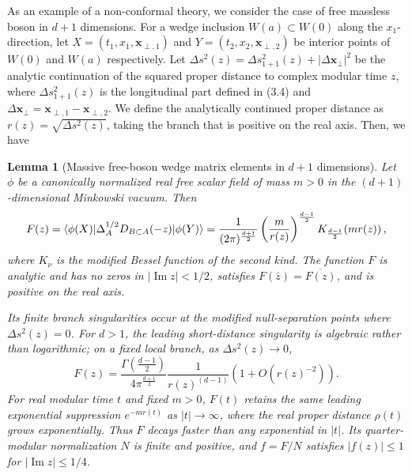 \documentclass[a4paper,11pt]{article}
\newtheorem{lemma}[theorem]{Lemma}
\theoremstyle{definition}
\newcommand{\lb}{\left(}
\newcommand{\rb}{\right)}
\begin{document}
As an example of a non-conformal theory, we consider the case of free massless boson in $d+1$ dimensions. For a wedge inclusion $W(a) \subset W(0)$ along the $x_1$-direction, let $X = (t_1, x_1, \mathbf{x}_{\perp, 1})$ and $Y = (t_2, x_2, \mathbf{x}_{\perp, 2})$ be interior points of $W(0)$ and $W(a)$ respectively. Let $\Delta s^2(z) = \Delta s_{1+1}^2(z) + |\Delta \mathbf{x}_\perp|^2$ be the analytic continuation of the squared proper distance to complex modular time $z$, where $\Delta s_{1+1}^2(z)$ is the longitudinal part defined in (3.4) and $\Delta \mathbf{x}_\perp = \mathbf{x}_{\perp, 1} - \mathbf{x}_{\perp, 2}$. We define the analytically continued proper distance as $r(z) = \sqrt{\Delta s^2(z)}$, taking the branch that is positive on the real axis. Then, we have
\begin{lemma}[Massive free-boson wedge matrix elements in $d+1$ dimensions] 
\label{lem:massive-free-boson-wedge-d-dim}
Let $\phi$ be a canonically normalized real free scalar field of mass $m > 0$ in the $(d+1)$-dimensional Minkowski vacuum. Then
\begin{equation}
    F(z) = \braket{\phi(X) | \Delta_A^{1/2} D_{B \subset A}(-z) | \phi(Y)} = \frac{1}{(2\pi)^{\frac{d+1}{2}}} \left( \frac{m}{r(z)} \right)^{\frac{d-1}{2}} K_{\frac{d-1}{2}}\!\left( m r(z) \right),
\end{equation}
where $K_{\nu}$ is the modified Bessel function of the second kind. The function $F$ is analytic and has no zeros in $|\operatorname{Im} z| < 1/2$, satisfies $F(\bar{z}) = \overline{F(z)}$, and is positive on the real axis. 

Its finite branch singularities occur at the modified null-separation points where $\Delta s^2(z) = 0$. For $d > 1$, the leading short-distance singularity is algebraic rather than logarithmic; on a fixed local branch, as $\Delta s^2(z) \to 0$,
\begin{equation}
    F(z) = \frac{\Gamma\left(\frac{d-1}{2}\right)}{4 \pi^{\frac{d+1}{2}}} \frac{1}{r(z)^{(d-1)}} \lb 1+O(r(z)^{-2})\rb.
\end{equation}
For real modular time $t$ and fixed $m>0$, $F(t)$ retains the same leading exponential suppression $e^{-m r(t)}$ as $|t| \to \infty$, where the real proper distance $\rho(t)$ grows exponentially. Thus $F$ decays faster than any exponential in $|t|$. Its quarter-modular normalization $N$ is finite and positive, and $f = F/N$ satisfies $|f(z)| \leq 1$ for $|\operatorname{Im} z| \leq 1/4$.
\end{lemma}
\end{document}
